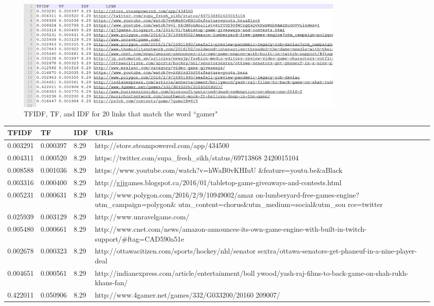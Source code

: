 \documentclass[12pt]{article}
\begin{document}

\newpage

\begin{figure}[h]
\centering
\includegraphics[width=6.5in]{data2.png}
\caption{TFIDF, TF, and IDF for 20 links that match the word ``gamer"}
\end{figure}

\begin{center}
\begin{tabular}{ | m{0.8in} | m{0.8in}| m{0.5in} | m{3.7in} | } 
\hline
TFIDF & TF & IDF & URIs\\
\hline
0.003291 & 0.000397 & 8.29 & http://store.steampowered.com/app/434500 \\ 
\hline
0.004311 & 0.000520 & 8.29 & https://twitter.com/supa\_fresh\_sikh/status/69713868 2420015104 \\ 
\hline
0.008588 & 0.001036 & 8.29 & https://www.youtube.com/watch?v=hWaB0vKHIuU \&feature=youtu.be\&aBlack  \\ 
\hline
0.003316 & 0.000400 & 8.29 & http://gjjgames.blogspot.ca/2016/01/tabletop-game-giveaways-and-contests.html \\ 
\hline
0.005231 & 0.000631 & 8.29 & http://www.polygon.com/2016/2/9/10949002/amaz on-lumberyard-free-games-engine?utm\_campaign=polygon\& utm\_content=chorus\&utm\_medium=social\&utm\_sou rce=twitter \\ 
\hline
0.025939 & 0.003129 & 8.29 & http://www.unravelgame.com/ \\ 
\hline
0.005480 & 0.000661 & 8.29 & http://www.cnet.com/news/amazon-announces-its-own-game-engine-with-built-in-twitch-support/\#ftag=CAD590a51e \\ 
\hline
0.002678 & 0.000323 & 8.29 & http://ottawacitizen.com/sports/hockey/nhl/senator sextra/ottawa-senators-get-phaneuf-in-a-nine-player-deal \\ 
\hline
0.004651 & 0.000561 & 8.29 & http://indianexpress.com/article/entertainment/boll ywood/yash-raj-films-to-back-game-on-shah-rukh-khans-fan/ \\ 
\hline
0.422011 & 0.050906 & 8.29 & http://www.4gamer.net/games/332/G033200/20160 209007/ \\ 
\hline
\end{tabular}
\end{center}
\end{document}
